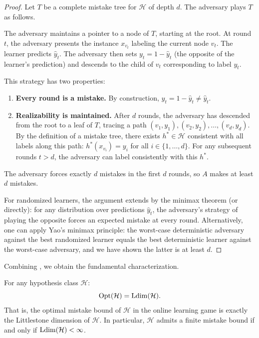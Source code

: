 \begin{proof}
Let $T$ be a complete mistake tree for $\mathcal{H}$ of depth $d$. The adversary plays $T$ as follows.

The adversary maintains a pointer to a node of $T$, starting at the root. At round $t$, the adversary presents the instance $x_{v_t}$ labeling the current node $v_t$. The learner predicts $\hat{y}_t$. The adversary then sets $y_t = 1 - \hat{y}_t$ (the opposite of the learner's prediction) and descends to the child of $v_t$ corresponding to label $y_t$.

This strategy has two properties:
\begin{enumerate}[leftmargin=*, itemsep=2pt]
\item \textbf{Every round is a mistake.} By construction, $y_t = 1 - \hat{y}_t \neq \hat{y}_t$.
\item \textbf{Realizability is maintained.} After $d$ rounds, the adversary has descended from the root to a leaf of $T$, tracing a path $(v_1, y_1), (v_2, y_2), \ldots, (v_d, y_d)$. By the definition of a mistake tree, there exists $h^* \in \mathcal{H}$ consistent with all labels along this path: $h^*(x_{v_i}) = y_i$ for all $i \in \{1, \ldots, d\}$. For any subsequent rounds $t > d$, the adversary can label consistently with this $h^*$.
\end{enumerate}

The adversary forces exactly $d$ mistakes in the first $d$ rounds, so $A$ makes at least $d$ mistakes.

For randomized learners, the argument extends by the minimax theorem (or directly): for any distribution over predictions $\hat{y}_t$, the adversary's strategy of playing the opposite forces an expected mistake at every round. Alternatively, one can apply Yao's minimax principle: the worst-case deterministic adversary against the best randomized learner equals the best deterministic learner against the worst-case adversary, and we have shown the latter is at least $d$.
\end{proof}

Combining , we obtain the fundamental characterization.

\begin{thm}
\label{thm:littlestone-characterization}
  \leanok
For any hypothesis class $\mathcal{H}$:
\[
\mathrm{Opt}(\mathcal{H}) = \mathrm{Ldim}(\mathcal{H}).
\]
That is, the optimal mistake bound of $\mathcal{H}$ in the online learning game is exactly the Littlestone dimension of $\mathcal{H}$. In particular, $\mathcal{H}$ admits a finite mistake bound if and only if $\mathrm{Ldim}(\mathcal{H}) < \infty$.
\end{thm}

